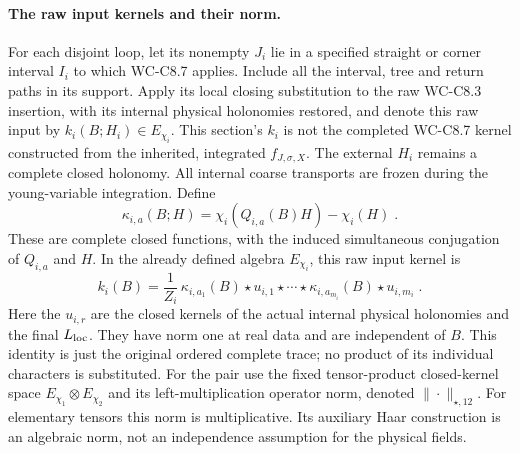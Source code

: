 \documentclass[11pt]{article}
\begin{document}
\paragraph{The raw input kernels and their norm.}
For each disjoint loop, let its nonempty $J_i$ lie in a specified
straight or corner interval $I_i$ to which WC-C8.7 applies.
Include all the interval, tree and return paths in its support.
Apply its local closing substitution to the raw WC-C8.3
insertion, with its internal physical holonomies restored,
and denote this raw input by $k_i(B;H_i)\in E_{\chi_i}$.
This section's $k_i$ is not the completed WC-C8.7 kernel
constructed from the inherited, integrated $f_{J,\sigma,X}$.
The external
$H_i$ remains a complete closed holonomy. All internal
coarse transports are frozen during the young-variable
integration. Define
\begin{equation}\label{eq:c8-fourth-elementary-mark}
    \kappa_{i,a}(B;H)=
        \chi_i(Q_{i,a}(B)H)-\chi_i(H)\;.
\end{equation}
These are complete closed functions, with the induced
simultaneous conjugation of $Q_{i,a}$ and $H$. In the
already defined algebra $E_{\chi_i}$, this raw input
kernel is
\begin{equation}\label{eq:c8-fourth-marked-star-word}
    k_i(B)=\frac{1}{Z_i}\,
        \kappa_{i,a_1}(B)\star u_{i,1}\star\cdots
        \star\kappa_{i,a_{m_i}}(B)\star u_{i,m_i}\;.
\end{equation}
Here the $u_{i,r}$ are the closed kernels of the actual
internal physical holonomies and the final $L_{\rm loc}$.
They have norm one at real data and are independent of $B$.
This identity is just the original ordered complete trace;
no product of its individual characters is substituted.
For the pair use the fixed tensor-product closed-kernel
space $E_{\chi_1}\otimes E_{\chi_2}$ and its left-multiplication
operator norm, denoted $\|\cdot\|_{\star,12}$.
For elementary tensors this norm is multiplicative.
Its auxiliary Haar construction is an algebraic norm,
not an independence assumption for the physical fields.
\end{document}
